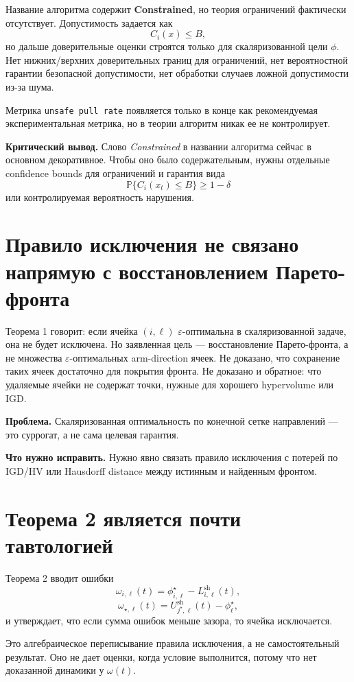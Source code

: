 \documentclass[11pt,a4paper]{article}
\newcommand{\code}[1]{\texttt{#1}}
\begin{document}
Название алгоритма содержит \textbf{Constrained}, но теория ограничений фактически отсутствует. Допустимость задается как
\[
C_i(x) \le B,
\]
но дальше доверительные оценки строятся только для скаляризованной цели $\phi$. Нет нижних/верхних доверительных границ для ограничений, нет вероятностной гарантии безопасной допустимости, нет обработки случаев ложной допустимости из-за шума.

Метрика \code{unsafe pull rate} появляется только в конце как рекомендуемая экспериментальная метрика, но в теории алгоритм никак ее не контролирует.

\textbf{Критический вывод.} Слово \emph{Constrained} в названии алгоритма сейчас в основном декоративное. Чтобы оно было содержательным, нужны отдельные confidence bounds для ограничений и гарантия вида
\[
\mathbb{P}\{C_i(x_t) \le B\} \ge 1-\delta
\]
или контролируемая вероятность нарушения.

\section{Правило исключения не связано напрямую с восстановлением Парето-фронта}

Теорема 1 говорит: если ячейка $(i,\ell)$ $\varepsilon$-оптимальна в скаляризованной задаче, она не будет исключена. Но заявленная цель --- восстановление Парето-фронта, а не множества $\varepsilon$-оптимальных arm-direction ячеек. Не доказано, что сохранение таких ячеек достаточно для покрытия фронта. Не доказано и обратное: что удаляемые ячейки не содержат точки, нужные для хорошего hypervolume или IGD.

\textbf{Проблема.} Скаляризованная оптимальность по конечной сетке направлений --- это суррогат, а не сама целевая гарантия.

\textbf{Что нужно исправить.} Нужно явно связать правило исключения с потерей по IGD/HV или Hausdorff distance между истинным и найденным фронтом.

\section{Теорема 2 является почти тавтологией}

Теорема 2 вводит ошибки
\[
\omega_{i,\ell}(t)=\phi_{i,\ell}^{\star}-L_{i,\ell}^{\mathrm{sh}}(t),
\]
\[
\omega_{\star,\ell}(t)=U_{j^{\star},\ell}^{\mathrm{sh}}(t)-\phi_\ell^{\star},
\]
и утверждает, что если сумма ошибок меньше зазора, то ячейка исключается.

Это алгебраическое переписывание правила исключения, а не самостоятельный результат. Оно не дает оценки, когда условие выполнится, потому что нет доказанной динамики у $\omega(t)$.
\end{document}
